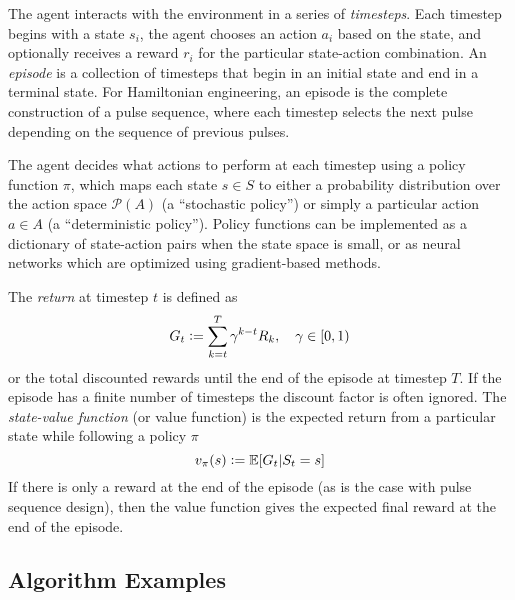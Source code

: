 The agent interacts with the environment in a series of \emph{timesteps}. Each timestep begins with a state $s_i$, the agent chooses an action $a_i$ based on the state, and optionally receives a reward $r_i$ for the particular state-action combination. An \emph{episode} is a collection of timesteps that begin in an initial state and end in a terminal state. For Hamiltonian engineering, an episode is the complete construction of a pulse sequence, where each timestep selects the next pulse depending on the sequence of previous pulses.

The agent decides what actions to perform at each timestep using a policy function $\pi$, which maps each state $s \in S$ to either a probability distribution over the action space $\mathcal{P}(A)$ (a ``stochastic policy'') or simply a particular action $a \in A$ (a ``deterministic policy''). Policy functions can be implemented as a dictionary of state-action pairs when the state space is small, or as neural networks which are optimized using gradient-based methods.

The \emph{return} at timestep $t$ is defined as
\begin{equation}\label{eq:return}
    G_t \mathrel{\mathop:}= \sum_{k=t}^T \gamma^{k-t} R_k, \quad \gamma \in [0,1)
\end{equation}
or the total discounted rewards until the end of the episode at timestep $T$. If the episode has a finite number of timesteps the discount factor is often ignored. The \emph{state-value function} (or value function) is the expected return from a particular state while following a policy $\pi$
\begin{equation}\label{eq:state_value}
    v_\pi(s) \mathrel{\mathop:}= \mathbb E[G_t | S_t = s]
\end{equation}
If there is only a reward at the end of the episode (as is the case with pulse sequence design), then the value function gives the expected final reward at the end of the episode.



\subsection{Algorithm Examples}

